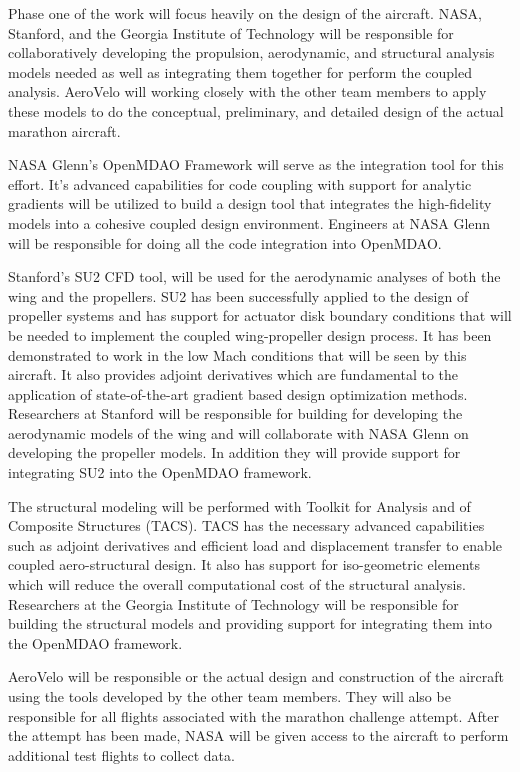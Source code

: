 \documentclass[]{aiaa-tc}
\begin{document}
    Phase one of the work will focus heavily on the design of the aircraft. NASA, Stanford, 
    and the Georgia Institute of Technology will be responsible for collaboratively developing 
    the propulsion, aerodynamic, and structural analysis models needed as well as integrating them 
    together for perform the coupled analysis. AeroVelo will working closely with the other team members
    to apply these models to do the conceptual, preliminary, and detailed design of the actual 
    marathon aircraft. 

    NASA Glenn's OpenMDAO Framework will serve as the integration tool for this effort. It's advanced 
    capabilities for code coupling with support for analytic gradients will be utilized to build 
    a design tool that integrates the high-fidelity models into a cohesive coupled design environment. 
    Engineers at NASA Glenn will be responsible for doing all the code integration into OpenMDAO. 

    Stanford's SU2 CFD tool, will be used for the aerodynamic analyses of both the wing and 
    the propellers. SU2 has been successfully applied to the design of propeller systems 
    and has support for actuator disk boundary conditions that will be needed to implement 
    the coupled wing­-propeller design process. It has been demonstrated to work in the low 
    Mach conditions that will be seen by this aircraft. It also provides adjoint derivatives 
    which are fundamental to the application of state­-of-­the-­art gradient based design 
    optimization methods. Researchers at Stanford will be responsible for building for developing 
    the aerodynamic models of the wing and will collaborate with NASA Glenn on developing the 
    propeller models. In addition they will provide support for integrating SU2 into the OpenMDAO 
    framework. 

    The structural modeling will be performed with Toolkit for Analysis and of Composite 
    Structures (TACS). TACS has the necessary advanced capabilities such as adjoint derivatives 
    and efficient load and displacement transfer to enable coupled aero­-structural design. It also has 
    support for iso-geometric elements which will reduce the overall computational cost of the 
    structural analysis. Researchers at the Georgia Institute of Technology will be responsible for 
    building the structural models and providing support for integrating them into the OpenMDAO framework. 

    AeroVelo will be responsible or the actual design and construction of the aircraft using the tools developed 
    by the other team members. They will also be responsible for all flights associated with 
    the marathon challenge attempt. After the attempt has been made, NASA will be given access to 
    the aircraft to perform additional test flights to collect data. 
\end{document}
